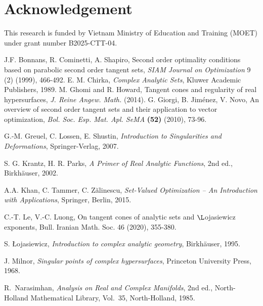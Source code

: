 \documentclass[10pt,reqno]{amsart}
\theoremstyle{break-italic}
\theoremstyle{break-italic}
\theoremstyle{break-italic}
\theoremstyle{break-italic}
\theoremstyle{break-italic}
\theoremstyle{break-italic}
\theoremstyle{break-italic}
\theoremstyle{break-italic}
\theoremstyle{break-roman}
\theoremstyle{standard}
\theoremstyle{varthm-roman}
\theoremstyle{varthm-italic}
\theoremstyle{varthm-roman-break}
\theoremstyle{varthm-italic-break}
\theoremstyle{varthm-roman-no-punctuation}
\theoremstyle{varthm-italic-no-punctuation}
\numberwithin{equation}{section}
\begin{document}
\section*{Acknowledgement}
This research  is funded  by Vietnam Ministry of Education and Training (MOET) under grant number B2025-CTT-04.


\begin{thebibliography}{}
  J.F. Bonnans, R. Cominetti, A. Shapiro, Second order optimality conditions based on parabolic second order tangent sets, \textit{SIAM Journal on Optimization} 9 (2) (1999), 466-492.
 E. M. Chirka, \textit{Complex Analytic Sets}, Kluwer Academic Publishers, 1989.
 M.  Ghomi and R. Howard, Tangent cones and regularity of real hypersurfaces,  \textit{J. Reine Angew. Math.} (2014).
 G. Giorgi, B. Jiménez, V. Novo,  An overview of second order tangent sets and their
application to vector optimization, \textit{Bol. Soc. Esp. Mat. Apl. SeMA} \textbf{(52)} (2010), 73-96. 

 G.-M. Greuel,   C. Lossen, E. Shustin, \textit{Introduction to Singularities and Deformations}, Springer-Verlag, 2007.

S. G. Krantz, H. R. Parks, \emph{A Primer of Real Analytic Functions},
2nd ed., Birkh\"auser, 2002.

 A.A. Khan,  C.  Tammer, C.  Zălinescu,   \textit{Set-Valued Optimization – An Introduction with Applications}, Springer, Berlin, 2015.

 C.-T. Le, V.-C. Luong, On tangent cones of analytic sets and $\L$ojasiewicz exponents, Bull. Iranian Math. Soc. 46 (2020), 355-380. 


 S. Łojasiewicz, \textit{Introduction to complex analytic geometry}, Birkh{\"a}user, 1995.
 
 J. Milnor, \textit{Singular points of complex hypersurfaces}, Princeton University Press, 1968.  


 R.~Narasimhan, \emph{Analysis on Real and Complex Manifolds},
2nd ed., North-Holland Mathematical Library, Vol.~35, North-Holland, 1985.



\end{thebibliography}
\end{document}
